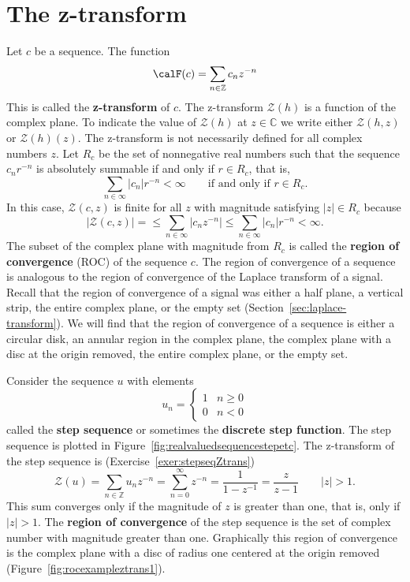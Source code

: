 \documentclass[11pt,a4paper]{book}
\theoremstyle{plain}
\numberwithin{equation}{section}
\newcommand{\ints}{{\mathbb Z}}
\newcommand{\complex}{{\mathbb C}}
\newcommand{\term}{\textbf}
\newcommand{\abs}[1]{\left\vert #1 \right\vert}
\newcommand{\sabs}[1]{\vert #1 \vert}
\begin{document}
\section{The z-transform}


\newcommand{\calZ}{{\mathcal Z}}

Let $c$ be a sequence.  The function
\[
\calF(c) = \sum_{n \in \ints} c_n z^{-n}
\]
This is called the \term{z-transform} of $c$. The z-transform $\calZ(h)$ is a function of the complex plane. To indicate the value of $\calZ(h)$ at $z \in \complex$ we write either $\calZ(h,z)$ or $\calZ(h)(z)$.  The z-transform is not necessarily defined for all complex numbers $z$.  Let $R_c$ be the set of nonnegative real numbers such that the sequence $c_n r^{-n}$ is absolutely summable if and only if $r \in R_c$, that is,
\[
\sum_{n \in \infty} \abs{c_n} r^{-n} < \infty \qquad \text{if and only if $r \in R_c$}.
\]
In this case, $\calZ(c,z)$ is finite for all $z$ with magnitude satisfying $\abs{z} \in R_c$ because 
\[
\sabs{\calZ(c,z)} = \leq \sum_{n \in \infty} \abs{c_n z^{-n}} \leq \sum_{n \in \infty} \abs{c_n} r^{-n} < \infty.
\]
The subset of the complex plane with magnitude from $R_c$ is called the \term{region of convergence} (ROC) of the sequence $c$.  The region of convergence of a sequence is analogous to the region of convergence of the Laplace transform of a signal.  Recall that the region of convergence of a signal was either a half plane, a vertical strip, the entire complex plane, or the empty set (Section~\ref{sec:laplace-transform}).  We will find that the region of convergence of a sequence is either a circular disk, an annular region in the complex plane, the complex plane with a disc at the origin removed, the entire complex plane, or the empty set.

Consider the sequence $u$ with elements 
\[
u_n = \begin{cases} 
1 & n \geq 0 \\
0 & n < 0 
\end{cases}
\]
called the \term{step sequence} or sometimes the \term{discrete step function}.  The step sequence is plotted in Figure~\ref{fig:realvaluedsequencestepetc}.  The z-transform of the step sequence is (Exercise~\ref{exer:stepseqZtrans})
\[
\calZ(u) = \sum_{n \in \ints} u_n z^{-n} = \sum_{n=0}^\infty z^{-n} = \frac{1}{1 - z^{-1}} = \frac{z}{z - 1} \qquad \abs{z} > 1.
\]
This sum converges only if the magnitude of $z$ is greater than one, that is, only if $\abs{z} > 1$.  The \term{region of convergence} of the step sequence is the set of complex number with magnitude greater than one.  Graphically this region of convergence is the complex plane with a disc of radius one centered at the origin removed (Figure~\ref{fig:rocexampleztrans1}).
\end{document}
